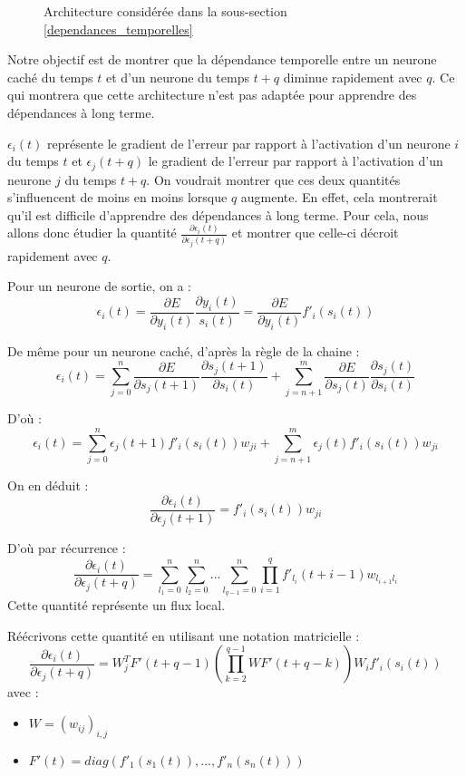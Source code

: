 \begin{figure}
\begin{center}

\caption{Architecture considérée dans la sous-section \ref{dependances_temporelles}}
\label{archi_dep_tempo}
\end{center}
\end{figure}

Notre objectif est de montrer que la dépendance temporelle entre un neurone caché du temps $t$ et d'un neurone du temps $t + q$ diminue rapidement avec $q$. Ce qui montrera que cette architecture n'est pas adaptée pour apprendre des dépendances à long terme.

$\epsilon_i(t)$ représente le gradient de l'erreur par rapport à l'activation d'un neurone $i$ du temps $t$ et $\epsilon_j(t+q)$ le gradient de l'erreur par rapport à l'activation d'un neurone $j$ du temps $t+q$. On voudrait montrer que ces deux quantités s'influencent de moins en moins lorsque $q$ augmente. En effet, cela montrerait qu'il est difficile d'apprendre des dépendances à long terme. Pour cela, nous allons donc étudier la quantité $\frac{\partial \epsilon_i(t)}{\partial \epsilon_j(t+q)}$ et montrer que celle-ci décroit rapidement avec $q$.

Pour un neurone de sortie, on a :
$$
\epsilon_i(t) = \frac{\partial E}{\partial y_i(t)}\frac{\partial y_i(t)}{s_i(t)} = \frac{\partial E}{\partial y_i(t)}f'_i(s_i(t))
$$

De même pour un neurone caché, d'après la règle de la chaine :
$$
\epsilon_i(t) = \sum_{j = 0}^{n}{\frac{\partial E}{\partial s_j(t+1)}\frac{\partial s_j(t+1)}{\partial s_i(t)}} + \sum_{j = n+1}^{m}{\frac{\partial E}{\partial s_j(t)}\frac{\partial s_j(t)}{\partial s_i(t)}}
$$

D'où :
$$
\epsilon_i(t) = \sum_{j = 0}^{n}{\epsilon_j(t+1)f'_i(s_i(t))w_{ji}} + \sum_{j = n+1}^{m}{\epsilon_j(t)f'_i(s_i(t))w_{ji}}
$$

On en déduit :
$$
\frac{\partial \epsilon_i(t)}{\partial \epsilon_j(t+1)} = f'_i(s_i(t))w_{ji}
$$

D'où par récurrence :
$$
\frac{\partial \epsilon_i(t)}{\partial \epsilon_j(t+q)} = \sum_{l_1 = 0}^{n}{\sum_{l_2 = 0}^{n}{...\sum_{l_{q-1} = 0}^{n}{\prod_{i=1}^{q}{f'_{l_i}(t+i-1)w_{l_{i+1}l_i}}}}}
$$
Cette quantité représente un flux local.

Réécrivons cette quantité en utilisant une notation matricielle :
$$
\frac{\partial \epsilon_i(t)}{\partial \epsilon_j(t+q)} = W_j^TF'(t + q - 1)(\prod_{k = 2}^{q-1}{WF'(t + q - k)})W_if'_i(s_i(t))
$$
avec : 
\begin{itemize}
\item $W = (w_{ij})_{i,j}$
\item $F'(t) = diag(f'_1(s_1(t)), ..., f'_n(s_n(t)))$
\end{itemize}

